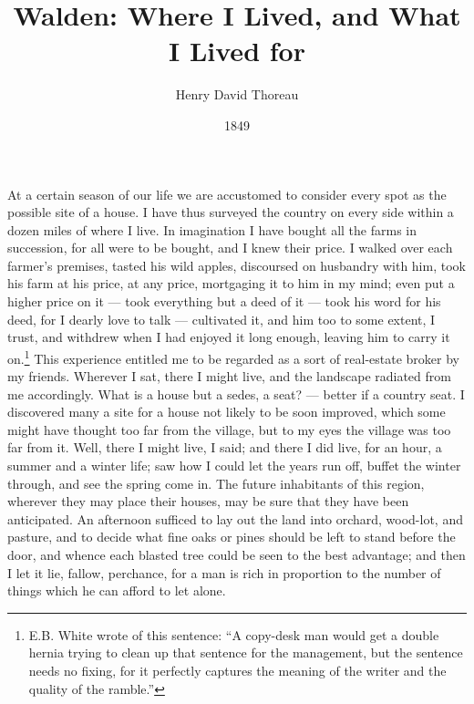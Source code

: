 \documentclass[letterpaper,12pt]{article}
\title{Walden: Where I Lived, and What I Lived for}
\author{Henry David Thoreau}
\date{1849}
\begin{document}
\maketitle

\paragraph{} At a certain season of our life we are accustomed to consider every
spot as the possible site of a house. I have thus surveyed the country on every
side within a dozen miles of where I live. In imagination I have bought all the
farms in succession, for all were to be bought, and I knew their price. I walked
over each farmer's premises, tasted his wild apples, discoursed on husbandry
with him, took his farm at his price, at any price, mortgaging it to him in my
mind; even put a higher price on it --- took everything but a deed of it ---
took his word for his deed, for I dearly love to talk --- cultivated it, and him
too to some extent, I trust, and withdrew when I had enjoyed it long enough,
leaving him to carry it on.\footnote{E.B. White wrote of this sentence:
    \enquote{A copy-desk man would get a double hernia trying to clean up that
        sentence for the management, but the sentence needs no fixing, for it
        perfectly captures the meaning of the writer and the quality of the
        ramble.}} This experience entitled me to be regarded as a sort of
real-estate broker by my friends. Wherever I sat, there I might live, and the
landscape radiated from me accordingly. What is a house but a sedes, a seat? ---
better if a country seat.  I discovered many a site for a house not likely to be
soon improved, which some might have thought too far from the village, but to my
eyes the village was too far from it. Well, there I might live, I said; and
there I did live, for an hour, a summer and a winter life; saw how I could let
the years run off, buffet the winter through, and see the spring come in. The
future inhabitants of this region, wherever they may place their houses, may be
sure that they have been anticipated. An afternoon sufficed to lay out the land
into orchard, wood-lot, and pasture, and to decide what fine oaks or pines
should be left to stand before the door, and whence each blasted tree could be
seen to the best advantage; and then I let it lie, fallow, perchance, for a man
is rich in proportion to the number of things which he can afford to let alone.
\end{document}

